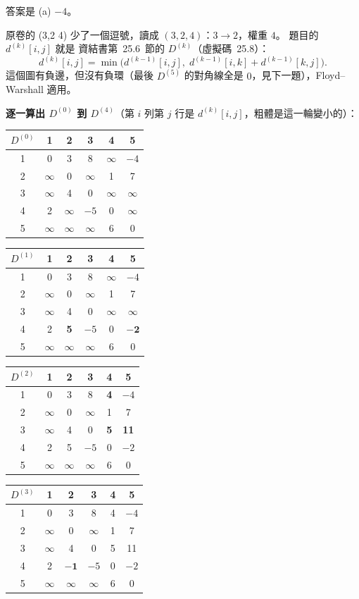 \begin{pastsoln}
答案是 (a) $-4$。

原卷的 (3,2 4) 少了一個逗號，讀成 $(3, 2, 4)$：$3 \to 2$，權重 $4$。 題目的 $d^{(k)}[i, j]$ 就是
資結書第~25.6~節的 $D^{(k)}$（虛擬碼~25.8）：
\[
d^{(k)}[i, j] = \min\bigl(d^{(k-1)}[i, j],\; d^{(k-1)}[i, k] + d^{(k-1)}[k, j]\bigr).
\]
這個圖有負邊，但沒有負環（最後 $D^{(5)}$ 的對角線全是 $0$，見下一題），Floyd--Warshall 適用。

\textbf{逐一算出 $D^{(0)}$ 到 $D^{(4)}$}（第 $i$ 列第 $j$ 行是 $d^{(k)}[i, j]$，粗體是這一輪變小的）：
\begin{center}
\small
\begin{tabular}{c|ccccc}
$D^{(0)}$ & 1 & 2 & 3 & 4 & 5 \\ \hline
1 & 0 & 3 & 8 & $\infty$ & $-4$ \\
2 & $\infty$ & 0 & $\infty$ & 1 & 7 \\
3 & $\infty$ & 4 & 0 & $\infty$ & $\infty$ \\
4 & 2 & $\infty$ & $-5$ & 0 & $\infty$ \\
5 & $\infty$ & $\infty$ & $\infty$ & 6 & 0 \\
\end{tabular}
\qquad
\begin{tabular}{c|ccccc}
$D^{(1)}$ & 1 & 2 & 3 & 4 & 5 \\ \hline
1 & 0 & 3 & 8 & $\infty$ & $-4$ \\
2 & $\infty$ & 0 & $\infty$ & 1 & 7 \\
3 & $\infty$ & 4 & 0 & $\infty$ & $\infty$ \\
4 & 2 & \textbf{5} & $-5$ & 0 & $\mathbf{-2}$ \\
5 & $\infty$ & $\infty$ & $\infty$ & 6 & 0 \\
\end{tabular}

\medskip
\begin{tabular}{c|ccccc}
$D^{(2)}$ & 1 & 2 & 3 & 4 & 5 \\ \hline
1 & 0 & 3 & 8 & \textbf{4} & $-4$ \\
2 & $\infty$ & 0 & $\infty$ & 1 & 7 \\
3 & $\infty$ & 4 & 0 & \textbf{5} & \textbf{11} \\
4 & 2 & 5 & $-5$ & 0 & $-2$ \\
5 & $\infty$ & $\infty$ & $\infty$ & 6 & 0 \\
\end{tabular}
\qquad
\begin{tabular}{c|ccccc}
$D^{(3)}$ & 1 & 2 & 3 & 4 & 5 \\ \hline
1 & 0 & 3 & 8 & 4 & $-4$ \\
2 & $\infty$ & 0 & $\infty$ & 1 & 7 \\
3 & $\infty$ & 4 & 0 & 5 & 11 \\
4 & 2 & $\mathbf{-1}$ & $-5$ & 0 & $-2$ \\
5 & $\infty$ & $\infty$ & $\infty$ & 6 & 0 \\
\end{tabular}


\end{center}
\end{pastsoln}
